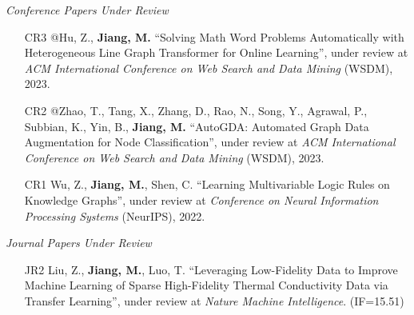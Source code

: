 \documentclass[10pt]{article}
\newenvironment{myindentpar}[1]%
{\begin{list}{}%
         {\setlength{\leftmargin}{#1}}%
         \item[]%
}
{\end{list}}
\newcounter{list}
\begin{document}
\begin{myindentpar}{0.00cm}

\vspace{.2cm}\hspace{-0.25cm}\textit{Conference Papers Under Review}

\begin{enumerate}[leftmargin=.5cm]

\item[CR3] @Hu, Z., \textbf{Jiang, M.} ``Solving Math Word Problems Automatically with Heterogeneous Line Graph Transformer for Online Learning'', under review at \textit{ACM International Conference on Web Search and Data Mining} (WSDM), 2023.

\item[CR2] @Zhao, T., Tang, X., Zhang, D., Rao, N., Song, Y., Agrawal, P., Subbian, K., Yin, B., \textbf{Jiang, M.} ``AutoGDA: Automated Graph Data Augmentation for Node Classification'', under review at \textit{ACM International Conference on Web Search and Data Mining} (WSDM), 2023.
		
\item[CR1] Wu, Z., \textbf{Jiang, M.}, Shen, C. ``Learning Multivariable Logic Rules on Knowledge Graphs'', under review at \textit{Conference on Neural Information Processing Systems} (NeurIPS), 2022.

	


\end{enumerate}

\vspace{.2cm}\hspace{-0.25cm}\textit{Journal Papers Under Review}

\begin{enumerate}[leftmargin=.5cm]

\item[JR2] Liu, Z., \textbf{Jiang, M.}, Luo, T. ``Leveraging Low-Fidelity Data to Improve Machine Learning of Sparse High-Fidelity Thermal Conductivity Data via Transfer Learning'', under review at \textit{Nature Machine Intelligence}. (IF=15.51)


\end{enumerate}
\end{myindentpar}
\end{document}
